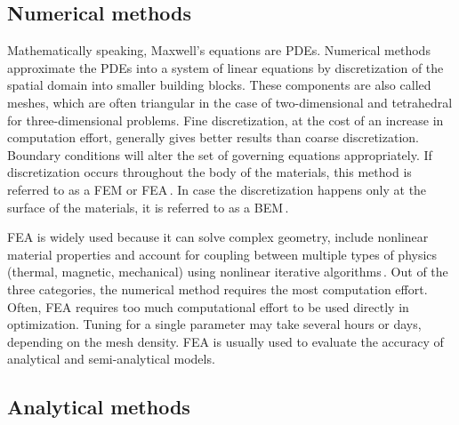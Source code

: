     \subsection{Numerical methods}                  \label{Chapter:background/modelling techniques for designing motors/numerical methods}
    
    
        Mathematically speaking, Maxwell's equations are \acsp{PDE}. Numerical methods approximate the \acsp{PDE} into a system of linear equations by discretization of the spatial domain into smaller building blocks. These components are also called meshes, which are often triangular in the case of two-dimensional and tetrahedral for three-dimensional problems. Fine discretization, at the cost of an increase in computation effort, generally gives better results than coarse discretization. Boundary conditions will alter the set of governing equations appropriately. If discretization occurs throughout the body of the materials, this method is referred to as a \ac{FEM} or \ac{FEA}\,\cite{Boglietti2009EvolutionMachines,Huang2009}. In case the discretization happens only at the surface of the materials, it is referred to as a \ac{BEM}\,\cite{Fetter1998TransientCoil,Qaseer2014HybridMotor}. 
        
        \acs{FEA} is widely used because it can solve complex geometry, include nonlinear material properties and account for coupling between multiple types of physics (thermal, magnetic, mechanical) using nonlinear iterative algorithms\,\cite{Sizov2013AutomatedEvolution}. Out of the three categories, the numerical method requires the most computation effort. Often, \acs{FEA} requires too much computational effort to be used directly in optimization. Tuning for a single parameter may take several hours or days, depending on the mesh density. \acs{FEA} is usually used to evaluate the accuracy of analytical and semi-analytical models.

    
    \subsection{Analytical methods}                 \label{Chapter:background/modelling techniques for designing motors/analytical methods}
    
